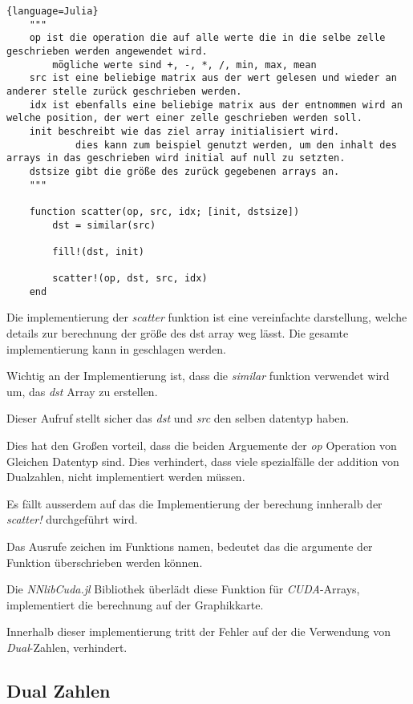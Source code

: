 \begin{lstlisting}{language=Julia}
	"""
	op ist die operation die auf alle werte die in die selbe zelle geschrieben werden angewendet wird.
		mögliche werte sind +, -, *, /, min, max, mean
	src ist eine beliebige matrix aus der wert gelesen und wieder an anderer stelle zurück geschrieben werden.
	idx ist ebenfalls eine beliebige matrix aus der entnommen wird an welche position, der wert einer zelle geschrieben werden soll.
	init beschreibt wie das ziel array initialisiert wird.
			dies kann zum beispiel genutzt werden, um den inhalt des arrays in das geschrieben wird initial auf null zu setzten.
	dstsize gibt die größe des zurück gegebenen arrays an.
	"""

	function scatter(op, src, idx; [init, dstsize])
		dst = similar(src)
		
		fill!(dst, init)
		
		scatter!(op, dst, src, idx)
	end
\end{lstlisting}

Die implementierung der \textit{scatter} funktion ist eine vereinfachte darstellung, 
welche details zur berechnung der größe des dst array weg lässt.
Die gesamte implementierung kann in  \cite{} geschlagen werden.

Wichtig an der Implementierung ist, dass die \textit{similar} funktion verwendet wird um, das
\textit{dst} Array zu erstellen.

Dieser Aufruf stellt sicher das \textit{dst} und \textit{src} den selben datentyp haben.

Dies hat den Großen vorteil, 
dass die beiden Arguemente der \textit{op} Operation von Gleichen Datentyp sind. 
Dies verhindert, 
dass viele spezialfälle der addition von Dualzahlen, nicht implementiert werden müssen.

Es fällt ausserdem auf das die Implementierung der berechung innheralb der \textit{scatter!}
durchgeführt wird.


Das Ausrufe zeichen im Funktions namen, bedeutet das die argumente der Funktion überschrieben werden können.


Die \textit{NNlibCuda.jl} Bibliothek überlädt diese Funktion für \textit{CUDA}-Arrays,
implementiert die berechnung auf der Graphikkarte.

Innerhalb dieser implementierung tritt der Fehler auf der die Verwendung von \textit{Dual}-Zahlen,
verhindert.
	
\subsection{Dual Zahlen}

